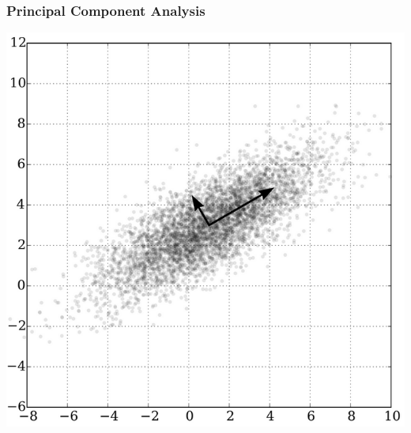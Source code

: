 \documentclass[xcolor=dvipsnames, english, 8pt]{beamer}
\begin{document}
\begin{frame}
    \frametitle{Principal Component Analysis}
\begin{center}
    \includegraphics[scale=0.35]{PCA}
\end{center}
\end{frame}
\end{document}
